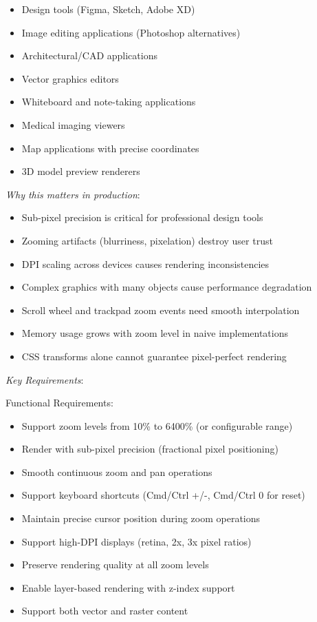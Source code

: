 \documentclass[11pt]{article}
\begin{document}
\begin{itemize}
\item Design tools (Figma, Sketch, Adobe XD)
\item Image editing applications (Photoshop alternatives)
\item Architectural/CAD applications
\item Vector graphics editors
\item Whiteboard and note-taking applications
\item Medical imaging viewers
\item Map applications with precise coordinates
\item 3D model preview renderers
\end{itemize}

\emph{Why this matters in production}:

\begin{itemize}
\item Sub-pixel precision is critical for professional design tools
\item Zooming artifacts (blurriness, pixelation) destroy user trust
\item DPI scaling across devices causes rendering inconsistencies
\item Complex graphics with many objects cause performance degradation
\item Scroll wheel and trackpad zoom events need smooth interpolation
\item Memory usage grows with zoom level in naive implementations
\item CSS transforms alone cannot guarantee pixel-perfect rendering
\end{itemize}

\emph{Key Requirements}:

Functional Requirements:

\begin{itemize}
\item Support zoom levels from 10\% to 6400\% (or configurable range)
\item Render with sub-pixel precision (fractional pixel positioning)
\item Smooth continuous zoom and pan operations
\item Support keyboard shortcuts (Cmd/Ctrl +/-, Cmd/Ctrl 0 for reset)
\item Maintain precise cursor position during zoom operations
\item Support high-DPI displays (retina, 2x, 3x pixel ratios)
\item Preserve rendering quality at all zoom levels
\item Enable layer-based rendering with z-index support
\item Support both vector and raster content
\end{itemize}
\end{document}
